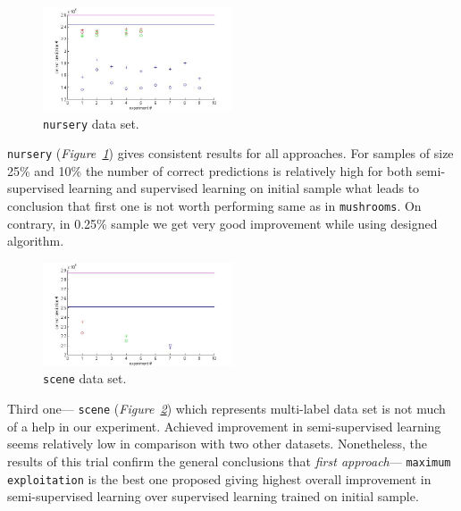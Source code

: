 \documentclass[12pt, a4paper, pdflatex]{report}
\begin{document}
\begin{figure}[htbp]
	\centering
	\includegraphics[width=0.5\textwidth]{graphics/figures/fig2.jpg}
	\begin{tiny}
		\caption{\small \texttt{nursery} data set.\label{img:nursery}}
	\end{tiny}
\end{figure}

\texttt{nursery} (\emph{Figure~\ref{img:nursery}}) gives consistent results for all approaches. For samples of size 25\% and 10\% the number of correct predictions is relatively high for both semi-supervised learning and supervised learning on initial sample what leads to conclusion that first one is not worth performing same as in \texttt{mushrooms}. On contrary, in 0.25\% sample we get very good improvement while using designed algorithm.\\

\begin{figure}[htbp]
	\centering
	\includegraphics[width=0.5\textwidth]{graphics/figures/fig3.jpg}
	\begin{tiny}
		\caption{\small \texttt{scene} data set.\label{img:scene}}
	\end{tiny}
\end{figure}

Third one--- \texttt{scene} (\emph{Figure~\ref{img:scene}}) which represents multi-label data set is not much of a help in our experiment. Achieved improvement in semi-supervised learning seems relatively low in comparison with two other datasets. Nonetheless, the results of this trial confirm the general conclusions that \emph{first approach}--- \texttt{maximum exploitation} is the best one proposed giving highest overall improvement in semi-supervised learning over supervised learning trained on initial sample.\\
\end{document}
